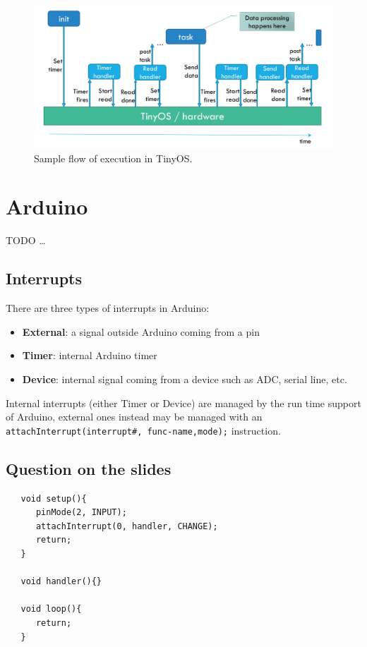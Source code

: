 \begin{figure}[htbp]
   \centering
   \includegraphics{images/tinyos_model.png}
   \caption{Sample flow of execution in TinyOS.}
   \label{fig:tinyos_model}
\end{figure}

\section{Arduino}

TODO \dots

\subsection{Interrupts}
There are three types of interrupts in Arduino:
\begin{itemize}
   \item \textbf{External}:
   a signal outside Arduino coming from a pin
   \item \textbf{Timer}:
   internal Arduino timer 
   \item \textbf{Device}:
   internal signal coming from a device such as ADC, serial line, etc.
\end{itemize}

Internal interrupts (either Timer or Device) are managed by
the run time support of Arduino, external ones instead may be managed with an \lstinline|attachInterrupt(interrupt#, func-name,mode);| instruction.


\subsection{Question on the slides}
\begin{lstlisting}
   void setup(){
      pinMode(2, INPUT);
      attachInterrupt(0, handler, CHANGE);
      return;
   }
   
   void handler(){}
   
   void loop(){
      return;
   }
\end{lstlisting}